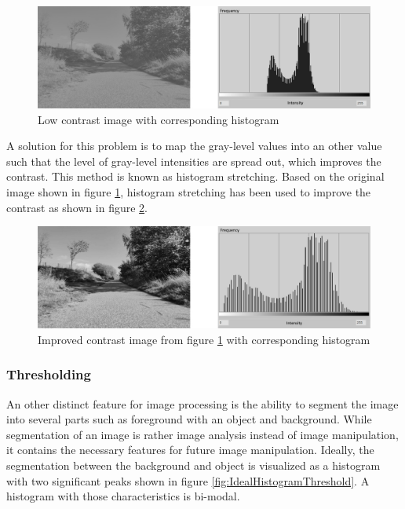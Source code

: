 \begin{figure}[H]
	\centering
	\includegraphics[width=1\textwidth]{8Misc/Pictures/Introduction/img_lc_full.jpg}
	\caption{Low contrast image with corresponding histogram}
	\label{fig:HistogramLowContrast}
\end{figure}

A solution for this problem is to map the gray-level values into an other value such that the level of gray-level intensities are spread out, which improves the contrast. This method is known as histogram stretching. Based on the original image shown in figure \ref{fig:HistogramLowContrast}, histogram stretching has been used to improve the contrast as shown in figure \ref{fig:HistogramImprovedContrast}.

\begin{figure}[H]
	\centering
	\includegraphics[width=1\textwidth]{8Misc/Pictures/Introduction/img_hc_full.jpg}
	\caption{Improved contrast image from figure \ref{fig:HistogramLowContrast} with corresponding histogram}
	\label{fig:HistogramImprovedContrast}
\end{figure}

\subsubsection*{Thresholding}
An other distinct feature for image processing is the ability to segment the image into several parts such as foreground with an object and background. While segmentation of an image is rather image analysis instead of image manipulation, it contains the necessary features for future image manipulation. Ideally, the segmentation between the background and object is visualized as a histogram with two significant peaks shown in figure \ref{fig:IdealHistogramThreshold}. A histogram with those characteristics is bi-modal. 

